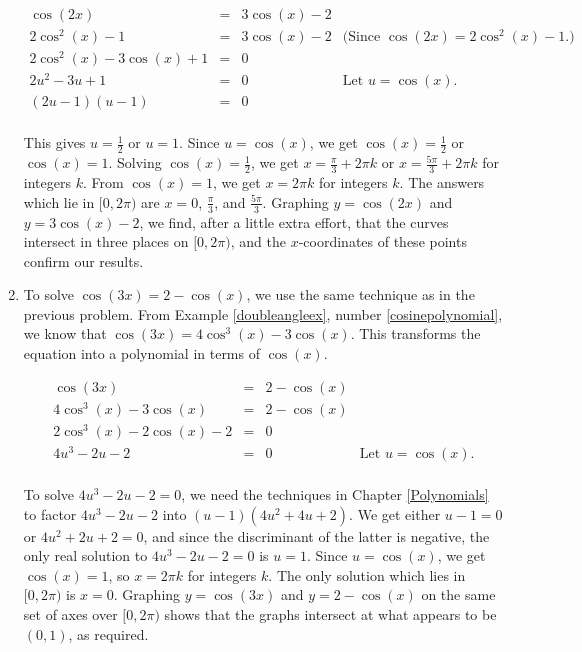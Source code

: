 \begin{ex}
\begin{enumerate}
\[ \begin{array}{rclr}

\cos(2x) & = & 3\cos(x) - 2 & \\
2\cos^{2}(x) -1 & = & 3\cos(x) -2 & \text{(Since $\cos(2x) = 2\cos^{2}(x) -1$.)} \\
2\cos^{2}(x) - 3\cos(x) +1 & = & 0 & \\
2 u^2 - 3 u + 1 & = & 0 & \text{Let $u = \cos(x)$.}\\
(2u - 1)(u - 1) & = & 0 & \\ \end{array} \]

This gives $u = \frac{1}{2}$ or $u = 1$.  Since $u = \cos(x)$, we get $\cos(x) = \frac{1}{2}$ or $\cos(x) = 1$.  Solving  $\cos(x) = \frac{1}{2}$, we get $x = \frac{\pi}{3} + 2\pi k$ or $x = \frac{5\pi}{3} + 2\pi k$ for integers $k$.  From $\cos(x) = 1$, we get $x = 2\pi k$ for integers $k$.  The answers which lie in $[0,2\pi)$ are $x =0$,  $\frac{\pi}{3}$, and $\frac{5\pi}{3}$.  Graphing $y = \cos(2x)$ and $y = 3\cos(x) - 2$, we find, after a little extra effort, that the curves intersect in three places on $[0,2\pi)$, and  the $x$-coordinates of these points confirm our results.


\item  To solve $\cos(3x) = 2- \cos(x)$, we use the same technique as in the previous problem.  From Example \ref{doubleangleex}, number \ref{cosinepolynomial}, we know that $\cos(3x) = 4\cos^{3}(x) - 3\cos(x)$.  This transforms the equation into a polynomial in terms of $\cos(x)$.


\[ \begin{array}{rclr}

\cos(3x) & = &2- \cos(x) & \\
4\cos^{3}(x) - 3\cos(x) & = & 2- \cos(x) & \\
2\cos^{3}(x) - 2\cos(x) -2  & = & 0 & \\
4 u^3 - 2 u -2  & = & 0 & \text{Let $u = \cos(x)$.} \\ \end{array} \]

To solve $4u^3-2u-2=0$, we need the techniques in Chapter \ref{Polynomials} to factor $4u^3-2u-2$ into $(u-1)\left(4u^2+4u+2\right)$.  We get either $u-1 = 0$ or  $4u^2+2u+2=0$, and since the discriminant of the latter is negative, the only real solution to $4u^3-2u-2=0$ is $u = 1$.  Since $u = \cos(x)$, we get $\cos(x) = 1$, so $x = 2\pi k$ for integers $k$.  The only solution which lies in $[0,2\pi)$ is $x = 0$.  Graphing $y = \cos(3x)$ and $y = 2- \cos(x)$ on the same set of axes over $[0,2\pi)$ shows that the graphs intersect at what appears to be $(0,1)$, as required.


\end{enumerate}
\end{ex}
